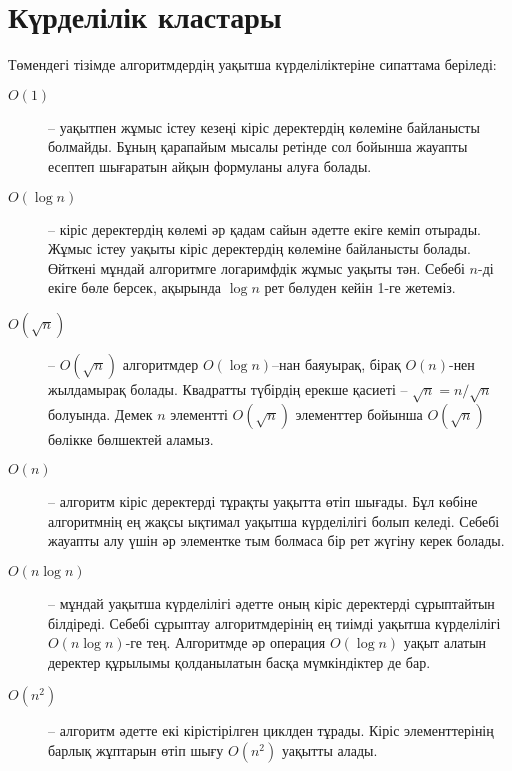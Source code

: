 \section{Күрделілік кластары}


Төмендегі тізімде алгоритмдердің уақытша күрделіліктеріне сипаттама беріледі:

\begin{description}
\item[$O(1)$] --
 уақытпен жұмыс істеу кезеңі кіріс деректердің көлеміне байланысты болмайды. Бұның қарапайым мысалы ретінде сол бойынша жауапты есептеп шығаратын айқын формуланы  алуға болады. 

\item[$O(\log n)$] --
кіріс деректердің көлемі әр қадам сайын әдетте екіге кеміп отырады. Жұмыс істеу уақыты кіріс деректердің көлеміне байланысты болады. Өйткені  мұндай алгоритмге логаримфдік жұмыс уақыты тән.
Себебі $n$-ді екіге бөле берсек, ақырында $\log n$ рет бөлуден кейін 1-ге жетеміз.

\item[$O(\sqrt n)$] --
 $O(\sqrt n)$ алгоритмдер $O(\log n)$–нан баяуырақ, бірақ $O(n)$-нен жылдамырақ болады.
Квадратты түбірдің ерекше қасиеті -- 
$\sqrt n = n/\sqrt n$ болуында. Демек $n$ элементті 
$O(\sqrt n)$ элементтер бойынша $O(\sqrt n)$ бөлікке бөлшектей аламыз.

\item[$O(n)$] --
 алгоритм кіріс деректерді тұрақты уақытта өтіп шығады.
Бұл көбіне алгоритмнің ең жақсы ықтимал уақытша күрделілігі болып келеді.
Себебі жауапты алу үшін әр элементке тым болмаса бір рет жүгіну керек болады. 

\item[$O(n \log n)$] --
 мұндай уақытша күрделілігі әдетте оның кіріс деректерді сұрыптайтын білдіреді. Себебі сұрыптау алгоритмдерінің 
ең тиімді уақытша күрделілігі $O(n \log n)$-ге тең. Алгоритмде әр операция $O(\log n)$ уақыт алатын деректер құрылымы қолданылатын басқа мүмкіндіктер де бар. 

\item[$O(n^2)$] --
 алгоритм әдетте екі
кірістірілген циклден тұрады. Кіріс элементтерінің барлық жұптарын
өтіп шығу $O(n^2)$ уақытты алады.


\end{description}
